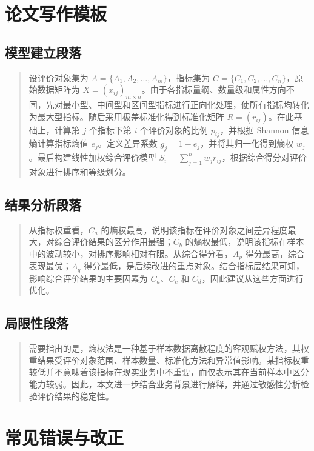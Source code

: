 \documentclass[UTF8,a4paper,12pt]{ctexart}
\begin{document}
\section{论文写作模板}

\subsection{模型建立段落}

\begin{quote}
设评价对象集为 $A=\{A_1,A_2,\ldots,A_m\}$，指标集为 $C=\{C_1,C_2,\ldots,C_n\}$，原始数据矩阵为 $X=(x_{ij})_{m\times n}$。由于各指标量纲、数量级和属性方向不同，先对最小型、中间型和区间型指标进行正向化处理，使所有指标均转化为最大型指标。随后采用极差标准化得到标准化矩阵 $R=(r_{ij})$。在此基础上，计算第 $j$ 个指标下第 $i$ 个评价对象的比例 $p_{ij}$，并根据 Shannon 信息熵计算指标熵值 $e_j$。定义差异系数 $g_j=1-e_j$，并将其归一化得到熵权 $w_j$。最后构建线性加权综合评价模型 $S_i=\sum_{j=1}^{n}w_jr_{ij}$，根据综合得分对评价对象进行排序和等级划分。
\end{quote}

\subsection{结果分析段落}

\begin{quote}
从指标权重看，$C_a$ 的熵权最高，说明该指标在评价对象之间差异程度最大，对综合评价结果的区分作用最强；$C_b$ 的熵权最低，说明该指标在样本中的波动较小，对排序影响相对有限。从综合得分看，$A_p$ 得分最高，综合表现最优；$A_q$ 得分最低，是后续改进的重点对象。结合指标层结果可知，影响综合评价结果的主要因素为 $C_a$、$C_c$ 和 $C_d$，因此建议从这些方面进行优化。
\end{quote}

\subsection{局限性段落}

\begin{quote}
需要指出的是，熵权法是一种基于样本数据离散程度的客观赋权方法，其权重结果受评价对象范围、样本数量、标准化方法和异常值影响。某指标权重较低并不意味着该指标在现实业务中不重要，而仅表示其在当前样本中区分能力较弱。因此，本文进一步结合业务背景进行解释，并通过敏感性分析检验评价结果的稳定性。
\end{quote}

\section{常见错误与改正}
\end{document}
